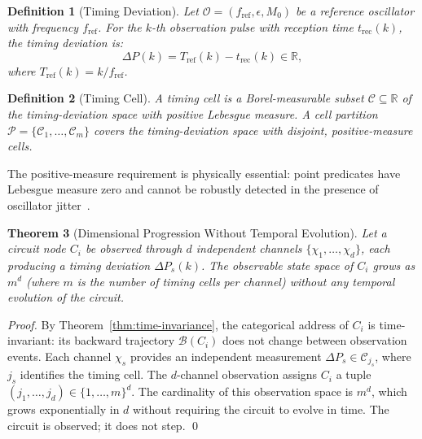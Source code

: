 \documentclass[11pt,twocolumn,a4paper]{article}
\newtheorem{theorem}{Theorem}[section]
\newtheorem{definition}[theorem]{Definition}
\newcommand{\R}{\mathbb{R}}
\newcommand{\Back}{\mathcal{B}}
\newcommand{\Part}{\mathcal{P}}
\newcommand{\Cat}{\mathcal{C}}
\newcommand{\DP}{\Delta P}
\newcommand{\Tref}{T_{\mathrm{ref}}}
\newcommand{\trec}{t_{\mathrm{rec}}}
\newcommand{\fref}{f_{\mathrm{ref}}}
\begin{document}
\begin{definition}[Timing Deviation]
\label{def:timing-deviation}
Let $\mathcal{O} = (\fref, \epsilon, M_0)$ be a reference oscillator
with frequency $\fref$.  For the $k$-th observation pulse with
reception time $\trec(k)$, the \emph{timing deviation} is:
\begin{equation}
  \DP(k) = \Tref(k) - \trec(k) \in \R,
  \label{eq:dp}
\end{equation}
where $\Tref(k) = k / \fref$.
\end{definition}

\begin{definition}[Timing Cell]
\label{def:timing-cell}
A \emph{timing cell} is a Borel-measurable subset
$\Cat \subseteq \R$ of the timing-deviation space with positive
Lebesgue measure.  A \emph{cell partition} $\Part = \{\Cat_1, \ldots,
\Cat_m\}$ covers the timing-deviation space with disjoint,
positive-measure cells.
\end{definition}

The positive-measure requirement is physically essential: point
predicates have Lebesgue measure zero and cannot be robustly detected
in the presence of oscillator jitter~\citep{rudin1987}.

\begin{theorem}[Dimensional Progression Without Temporal Evolution]
\label{thm:dimensional-progression}
Let a circuit node $C_i$ be observed through $d$ independent channels
$\{\chi_1, \ldots, \chi_d\}$, each producing a timing deviation
$\DP_s(k)$.  The observable state space of $C_i$ grows as $m^d$
(where $m$ is the number of timing cells per channel) \emph{without
any temporal evolution of the circuit}.
\end{theorem}

\begin{proof}
By Theorem~\ref{thm:time-invariance}, the categorical address of
$C_i$ is time-invariant: its backward trajectory $\Back(C_i)$ does
not change between observation events.  Each channel $\chi_s$ provides
an independent measurement $\DP_s \in \Cat_{j_s}$, where $j_s$
identifies the timing cell.  The $d$-channel observation assigns $C_i$
a tuple $(j_1, \ldots, j_d) \in \{1, \ldots, m\}^d$.  The
cardinality of this observation space is $m^d$, which grows
exponentially in $d$ without requiring the circuit to evolve in time.
The circuit is observed; it does not step.  \qed
\end{proof}
\end{document}
